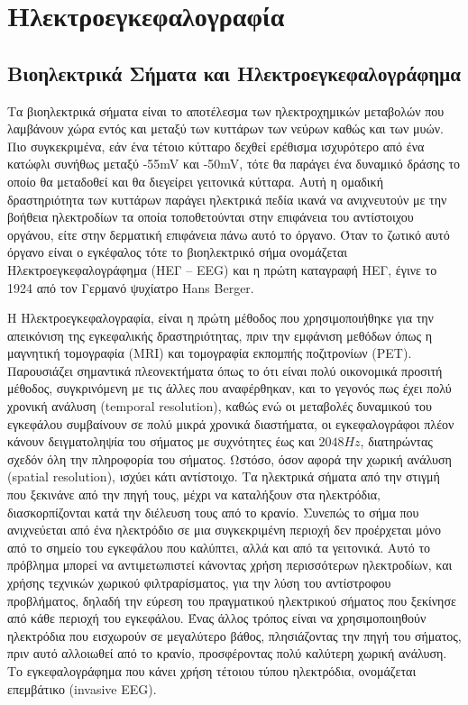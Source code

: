 \documentclass[11pt,a4paper,english,greek,twoside]{../Thesis}
\begin{document}
\chapter{Ηλεκτροεγκεφαλογραφία}
\section{Βιοηλεκτρικά Σήματα και Ηλεκτροεγκεφαλογράφημα}
Τα βιοηλεκτρικά σήματα είναι το αποτέλεσμα των ηλεκτροχημικών μεταβολών που λαμβάνουν χώρα εντός και μεταξύ των κυττάρων των νεύρων καθώς και των μυών. Πιο συγκεκριμένα, εάν ένα τέτοιο κύτταρο δεχθεί ερέθισμα ισχυρότερο από ένα κατώφλι συνήθως μεταξύ  -55mV και -50mV, τότε θα παράγει ένα δυναμικό δράσης το οποίο θα μεταδοθεί και θα διεγείρει γειτονικά κύτταρα. Αυτή η ομαδική δραστηριότητα των κυττάρων παράγει ηλεκτρικά πεδία ικανά να ανιχνευτούν με την βοήθεια ηλεκτροδίων τα οποία τοποθετούνται στην επιφάνεια του αντίστοιχου οργάνου, είτε στην δερματική επιφάνεια πάνω αυτό το όργανο. Όταν το ζωτικό αυτό όργανο είναι ο εγκέφαλος τότε το βιοηλεκτρικό σήμα ονομάζεται Ηλεκτροεγκεφαλογράφημα (ΗΕΓ – EEG) και η πρώτη καταγραφή ΗΕΓ, έγινε το 1924 από τον Γερμανό ψυχίατρο Hans Berger. 

Η Ηλεκτροεγκεφαλογραφία, είναι η πρώτη μέθοδος που χρησιμοποιήθηκε για την απεικόνιση της εγκεφαλικής δραστηριότητας, πριν την εμφάνιση μεθόδων όπως η μαγνητική τομογραφία (MRI) και τομογραφία εκπομπής ποζιτρονίων (PET). Παρουσιάζει σημαντικά πλεονεκτήματα όπως το ότι είναι πολύ οικονομικά προσιτή μέθοδος, συγκρινόμενη με τις άλλες που αναφέρθηκαν, και το γεγονός πως έχει πολύ χρονική ανάλυση (temporal resolution), καθώς ενώ οι μεταβολές δυναμικού του εγκεφάλου συμβαίνουν σε πολύ μικρά χρονικά διαστήματα, οι εγκεφαλογράφοι πλέον κάνουν δειγματοληψία του σήματος με συχνότητες έως και $2048Hz$, διατηρώντας σχεδόν όλη την πληροφορία του σήματος. Ωστόσο, όσον αφορά την χωρική ανάλυση (spatial resolution), ισχύει κάτι αντίστοιχο. Τα ηλεκτρικά σήματα από την στιγμή που ξεκινάνε από την πηγή τους, μέχρι να καταλήξουν στα ηλεκτρόδια, διασκορπίζονται κατά την διέλευση τους από το κρανίο. Συνεπώς το σήμα που ανιχνεύεται από ένα ηλεκτρόδιο σε μια συγκεκριμένη περιοχή δεν προέρχεται μόνο από το σημείο του εγκεφάλου που καλύπτει, αλλά και από τα γειτονικά. Αυτό το πρόβλημα μπορεί να αντιμετωπιστεί κάνοντας χρήση περισσότερων ηλεκτροδίων, και χρήσης τεχνικών χωρικού φιλτραρίσματος, για την λύση του αντίστροφου προβλήματος, δηλαδή την εύρεση του πραγματικού ηλεκτρικού σήματος που ξεκίνησε από κάθε περιοχή του εγκεφάλου. Ένας άλλος τρόπος είναι να χρησιμοποιηθούν ηλεκτρόδια που εισχωρούν σε μεγαλύτερο βάθος, πλησιάζοντας την πηγή του σήματος, πριν αυτό αλλοιωθεί από το κρανίο, προσφέροντας πολύ καλύτερη χωρική ανάλυση. Το εγκεφαλογράφημα που κάνει χρήση τέτοιου τύπου ηλεκτρόδια, ονομάζεται επεμβάτικο (invasive EEG).
\end{document}

